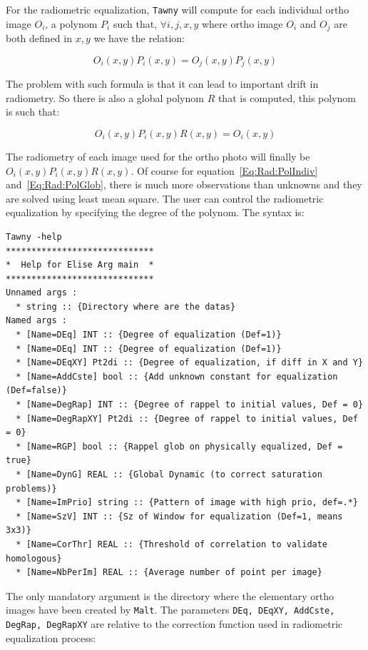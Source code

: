 For the radiometric equalization, {\tt Tawny}  will compute for each
individual ortho image $O_i$, a polynom $P_i$ such that, $\forall i,j,x,y$
where ortho image $O_i$ and $O_j$ are both defined in $x,y$ we have the relation:

\begin{equation}
   O_i(x,y) P_i(x,y) = O_j(x,y) P_j(x,y)
\label{Eq:Rad:PolIndiv}
\end{equation}


The problem with such formula is that it can lead to important drift in radiometry.
So there is also a global polynom $R$ that is computed, this polynom is such that:

\begin{equation}
   O_i(x,y) P_i(x,y) R(x,y) =  O_i(x,y)
\label{Eq:Rad:PolGlob}
\end{equation}

The radiometry of each image used for the ortho photo will finally be $O_i(x,y) P_i(x,y) R(x,y)$.
Of course for equation~\ref{Eq:Rad:PolIndiv} and~\ref{Eq:Rad:PolGlob}, there is
much more observations than unknowns and they are solved using least mean square.
The user can control the radiometric equalization by specifying the 
degree of the polynom. The syntax is:




\begin{verbatim}
Tawny -help
*****************************
*  Help for Elise Arg main  *
*****************************
Unnamed args : 
  * string :: {Directory where are the datas}
Named args : 
  * [Name=DEq] INT :: {Degree of equalization (Def=1)}
  * [Name=DEq] INT :: {Degree of equalization (Def=1)}
  * [Name=DEqXY] Pt2di :: {Degree of equalization, if diff in X and Y}
  * [Name=AddCste] bool :: {Add unknown constant for equalization (Def=false)}
  * [Name=DegRap] INT :: {Degree of rappel to initial values, Def = 0}
  * [Name=DegRapXY] Pt2di :: {Degree of rappel to initial values, Def = 0}
  * [Name=RGP] bool :: {Rappel glob on physically equalized, Def = true}
  * [Name=DynG] REAL :: {Global Dynamic (to correct saturation problems)}
  * [Name=ImPrio] string :: {Pattern of image with high prio, def=.*}
  * [Name=SzV] INT :: {Sz of Window for equalization (Def=1, means 3x3)}
  * [Name=CorThr] REAL :: {Threshold of correlation to validate homologous}
  * [Name=NbPerIm] REAL :: {Average number of point per image}
\end{verbatim}

The only mandatory argument is the directory where the 
elementary ortho images have been created by {\tt Malt}. The parameters
{\tt DEq, DEqXY, AddCste, DegRap, DegRapXY} are relative to the correction
function used in radiometric equalization process:

